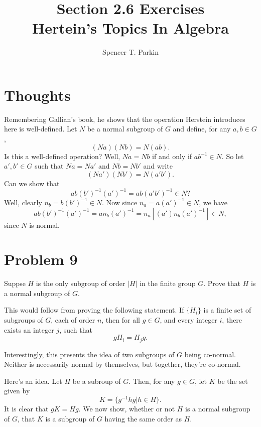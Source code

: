\documentclass[12pt]{article}
\title{Section 2.6 Exercises\\Hertein's Topics In Algebra}
\author{Spencer T. Parkin}
\begin{document}
\maketitle

\section*{Thoughts}

Remembering Gallian's book, he shows that the operation Herstein introduces here is well-defined.
Let $N$ be a normal subgroup of $G$ and define, for any $a,b\in G$,
\begin{equation*}
(Na)(Nb)=N(ab).
\end{equation*}
Is this a well-defined operation?  Well, $Na=Nb$ if and only if $ab^{-1}\in N$.
So let $a',b'\in G$ such that $Na=Na'$ and $Nb=Nb'$ and write
\begin{equation*}
(Na')(Nb') = N(a'b').
\end{equation*}
Can we show that
\begin{equation*}
ab(b')^{-1}(a')^{-1} = ab(a'b')^{-1}\in N?
\end{equation*}
Well, clearly $n_b=b(b')^{-1}\in N$.  Now since $n_a=a(a')^{-1}\in N$,
we have
\begin{equation*}
ab(b')^{-1}(a')^{-1} = an_b(a')^{-1} = n_a[(a')n_b(a')^{-1}]\in N,
\end{equation*}
since $N$ is normal.

\section*{Problem 9}

Suppse $H$ is the only subgroup of order $|H|$ in the finite group $G$.
Prove that $H$ is a normal subgroup of $G$.

This would follow from proving the following statement.
If $\{H_i\}$ is a finite set of subgroups of $G$, each of order $n$, then
for all $g\in G$, and every integer $i$, there exists an integer $j$, such that
\begin{equation*}
gH_i = H_jg.
\end{equation*}

Interestingly, this presents the idea of two subgroups of $G$ being
co-normal.  Neither is necessarily normal by themselves, but together,
they're co-normal.

Here's an idea.  Let $H$ be a subroup of $G$.
Then, for any $g\in G$, let $K$ be the set given by
\begin{equation*}
K = \{g^{-1}hg|h\in H\}.
\end{equation*}
It is clear that $gK=Hg$.  We now show, whether or not $H$ is
a normal subgroup of $G$, that $K$ is a subgroup of $G$ having the
same order as $H$.
\end{document}

